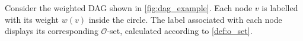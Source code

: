 \begin{example}
    \label{ex:o_set_calc}
    Consider the weighted DAG shown in \autoref{fig:dag_example}. Each node $v$ is labelled with its weight $w(v)$ inside the circle. The label associated with each node displays its corresponding $\mathcal{O}$-set, calculated according to \ref{def:o_set}.


\end{example}
